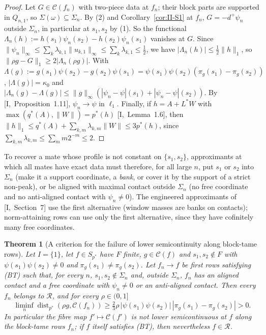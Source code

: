 \documentclass[10pt]{amsart}
\newtheorem{theorem}{Theorem}[section]
\theoremstyle{definition}
\theoremstyle{remark}
\newcommand{\dist}{\operatorname{dist}}
\newcommand{\Cset}{\mathcal C}
\newcommand{\Rec}{\mathcal R}
\begin{document}
\begin{proof}
Let $G\in\Cset(f_n)$ with two-piece data at $f_n$; their block parts are
supported in $Q_{n,1}$, so $\Sigma(\omega)\subseteq\Sigma_n$.  By (2) and
Corollary~\ref{cor:II-S1} at $f_n$, $G=-d^+\psi_n$ outside $\Sigma_n$, in
particular at $s_1,s_2$ by (1).  So the functional $\Lambda_n(h):=h(s_1)
\psi_n(s_2)-h(s_2)\psi_n(s_1)$ vanishes at $G$.  Since $\|\psi_n\|_\infty\le
\sum_k\lambda_{k,1}\|u_{k,1}\|_\infty\le\sum_k\lambda_{k,1}\le\frac12$, we
have $|\Lambda_n(h)|\le\frac12\|h\|_1$, so $\|\rho g-G\|_1\ge2|\Lambda_n(\rho
g)|$.  With $\Lambda(g):=g(s_1)\psi(s_2)-g(s_2)\psi(s_1)=\psi(s_1)\psi(s_2)
(\pi_g(s_1)-\pi_g(s_2))$, $|\Lambda(g)|=\kappa_0$ and $|\Lambda_n(g)-\Lambda(g)|
\le\|g\|_\infty(|\psi_n-\psi|(s_1)+|\psi_n-\psi|(s_2))$.  By
[I,~Proposition~1.11], $\psi_n\to\psi$ in $\ell_1$.  Finally, if $h=A+L^*W$
with $\max(q^*(A),\|W\|)=p^*(h)$ [I,~Lemma~1.6], then $\|h\|_1\le q^*(A)+
\sum_{k,m}\lambda_{k,m}\|W\|\le3p^*(h)$, since $\sum_{k,m}\lambda_{k,m}\le
\sum_mm2^{-m}\le2$.
\end{proof}

To recover a mate whose profile is not constant on $\{s_1,s_2\}$,
approximants at which all mates have exact data must therefore, for all large
$n$, put $s_1$ or $s_2$ into $\Sigma_n$ (make it a support coordinate, a
\emph{bank}, or cover it by the support of a strict non-peak), or be aligned
with maximal contact outside $\Sigma_n$ (no free coordinate and no
anti-aligned contact with $\psi_n\ne0$).  The engineered approximants of
[I,~Section~7] use the first alternative (window masses are banks on
contacts); norm-attaining rows can use only the first alternative, since
they have cofinitely many free coordinates.

\begin{theorem}[A criterion for the failure of lower semicontinuity along block-tame rows]\label{thm:II-NL}
Let $I=\{1\}$, let $f\in S_{p^*}$ have $F$ finite, $g\in\Cset(f)$ and
$s_1,s_2\notin F$ with $\psi(s_1)\psi(s_2)\ne0$ and $\pi_g(s_1)\ne\pi_g(s_2)$.
Let $f_n\to f$ be first rows satisfying \textup{(BT)} such that, for every
$n$, $s_1,s_2\notin\Sigma_n$ and, outside $\Sigma_n$, $f_n$ has an aligned
contact and a free coordinate with $\psi_n\ne0$ or an anti-aligned contact.
Then every $f_n$ belongs to $\Rec$, and for every $\rho\in(0,1]$
\[
 \liminf_n\dist_{p^*}(\rho g,\Cset(f_n))\ge\tfrac23\rho\,|\psi(s_1)\psi(s_2)|\,
 |\pi_g(s_1)-\pi_g(s_2)|>0 .
\]
In particular the fibre map $f'\mapsto\Cset(f')$ is not lower semicontinuous
at $f$ along the block-tame rows $f_n$; if $f$ itself satisfies \textup{(BT)},
then nevertheless $f\in\Rec$.
\end{theorem}
\end{document}
